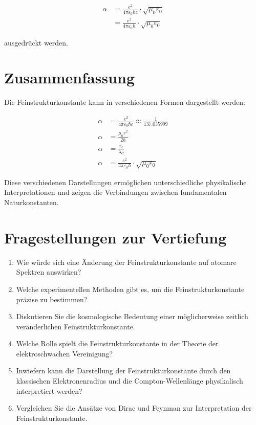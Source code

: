 \documentclass{article}
\begin{document}
	\begin{align}
		\alpha &= \frac{e^2}{4\pi\varepsilon_0\hbar c} \cdot \sqrt{\mu_0\varepsilon_0}\\
		&= \frac{e^2}{4\pi\varepsilon_0\hbar} \cdot \sqrt{\mu_0\varepsilon_0}
	\end{align}
	
	ausgedrückt werden.
	
	\section{Zusammenfassung}
	Die Feinstrukturkonstante kann in verschiedenen Formen dargestellt werden:
	
	\begin{align}
		\alpha &= \frac{e^2}{4\pi\varepsilon_0\hbar c} \approx \frac{1}{137.035999}\\
		\alpha &= \frac{\mu_0e^2}{2h}\\
		\alpha &= \frac{r_e}{\lambda_C}\\
		\alpha &= \frac{e^2}{4\pi\varepsilon_0\hbar} \cdot \sqrt{\mu_0\varepsilon_0}
	\end{align}
	
	Diese verschiedenen Darstellungen ermöglichen unterschiedliche physikalische Interpretationen und zeigen die Verbindungen zwischen fundamentalen Naturkonstanten.
	
	\section{Fragestellungen zur Vertiefung}
	
	\begin{enumerate}
		\item Wie würde sich eine Änderung der Feinstrukturkonstante auf atomare Spektren auswirken?
		\item Welche experimentellen Methoden gibt es, um die Feinstrukturkonstante präzise zu bestimmen?
		\item Diskutieren Sie die kosmologische Bedeutung einer möglicherweise zeitlich veränderlichen Feinstrukturkonstante.
		\item Welche Rolle spielt die Feinstrukturkonstante in der Theorie der elektroschwachen Vereinigung?
		\item Inwiefern kann die Darstellung der Feinstrukturkonstante durch den klassischen Elektronenradius und die Compton-Wellenlänge physikalisch interpretiert werden?
		\item Vergleichen Sie die Ansätze von Dirac und Feynman zur Interpretation der Feinstrukturkonstante.
	\end{enumerate}
\end{document}

